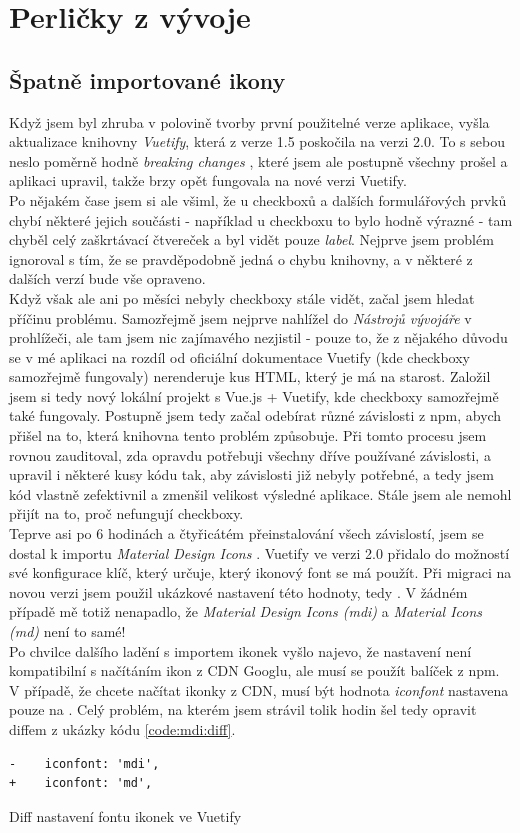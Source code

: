\section{Perličky z vývoje}

\subsection{Špatně importované ikony}

Když jsem byl zhruba v polovině tvorby první použitelné verze aplikace, vyšla aktualizace knihovny \emph{Vuetify}, která z verze 1.5 poskočila na verzi 2.0. To s sebou neslo poměrně hodně \emph{breaking changes} \cite{vuetify-2-upgrade}, které jsem ale postupně všechny prošel a aplikaci upravil, takže brzy opět fungovala na nové verzi Vuetify.\\
Po nějakém čase jsem si ale všiml, že u checkboxů a dalších formulářových prvků chybí některé jejich součásti - například u checkboxu to bylo hodně výrazné - tam chyběl celý zaškrtávací čtvereček a byl vidět pouze \emph{label}. Nejprve jsem problém ignoroval s tím, že se pravděpodobně jedná o chybu knihovny, a v některé z dalších verzí bude vše opraveno.\\
Když však ale ani po měsíci nebyly checkboxy stále vidět, začal jsem hledat příčinu problému. Samozřejmě jsem nejprve nahlížel do \emph{Nástrojů vývojáře} v prohlížeči, ale tam jsem nic zajímavého nezjistil - pouze to, že z nějakého důvodu se v mé aplikaci na rozdíl od oficiální dokumentace Vuetify \cite{vuetify-doc-checkbox} (kde checkboxy samozřejmě fungovaly) nerenderuje kus HTML, který je má na starost. Založil jsem si tedy nový lokální projekt s Vue.js + Vuetify, kde checkboxy samozřejmě také fungovaly. Postupně jsem tedy začal odebírat různé závislosti z npm, abych přišel na to, která knihovna tento problém způsobuje. Při tomto procesu jsem rovnou zauditoval, zda opravdu potřebuji všechny dříve používané závislosti, a upravil i některé kusy kódu tak, aby závislosti již nebyly potřebné, a tedy jsem kód vlastně zefektivnil a zmenšil velikost výsledné aplikace. Stále jsem ale nemohl přijít na to, proč nefungují checkboxy.\\
Teprve asi po 6 hodinách a čtyřicátém přeinstalování všech závislostí, jsem se dostal k importu \emph{Material Design Icons} \cite{mdi}. Vuetify ve verzi 2.0 přidalo do možností své konfigurace klíč, který určuje, který ikonový font se má použít. Při migraci na novou verzi jsem použil ukázkové nastavení této hodnoty, tedy . V žádném případě mě totiž nenapadlo, že \emph{Material Design Icons (mdi)} a \emph{Material Icons (md)} není to samé!\\
Po chvilce dalšího ladění s importem ikonek vyšlo najevo, že nastavení  není kompatibilní s načítáním ikon z CDN Googlu, ale musí se použít balíček z npm. V případě, že chcete načítat ikonky z CDN, musí být hodnota \emph{iconfont} nastavena pouze na . Celý problém, na kterém jsem strávil tolik hodin šel tedy opravit diffem z ukázky kódu \ref{code:mdi:diff}.

\begin{listing}[h]
\begin{verbatim}
-    iconfont: 'mdi',
+    iconfont: 'md',
\end{verbatim}
\caption{Diff nastavení fontu ikonek ve Vuetify} \label{code:mdi:diff}
\end{listing}
